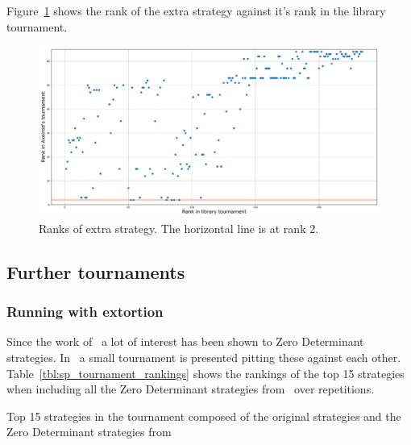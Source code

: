 \documentclass{article}
\begin{document}
Figure~\ref{fig:original_tournament_with_extra_strategy_ranks_vs_library_ranks}
shows the rank of the extra strategy against it's rank in the library
tournament.

\begin{figure}[!hbtp]
    \centering
    \includegraphics[width=.8\textwidth]{assets/original_tournament_with_extra_strategy_ranks_vs_library_ranks.pdf}
    \caption{Ranks of extra strategy. The horizontal line is at rank 2.}
    \label{fig:original_tournament_with_extra_strategy_ranks_vs_library_ranks}
\end{figure}



\subsection{Further tournaments}


\subsubsection{Running with extortion}\label{sec:run_with_stewart_plotkin}

Since the work of~\cite{Press2012} a lot of interest has been shown to Zero
Determinant strategies. In~\cite{Stewart2012} a small tournament is presented
pitting these against each other. Table~\ref{tbl:sp_tournament_rankings}
shows the rankings of the top 15 strategies when including all the Zero
Determinant strategies from~\cite{Stewart2012} over
repetitions.

\begin{table}[!hbtp]
        \centering
        
        \caption{Top 15 strategies in the tournament composed of the original
                 strategies and the Zero Determinant strategies
                 from~\cite{Stewart2012}}
        \label{tbl:sp_tournament_rankings}
\end{table}
\end{document}

